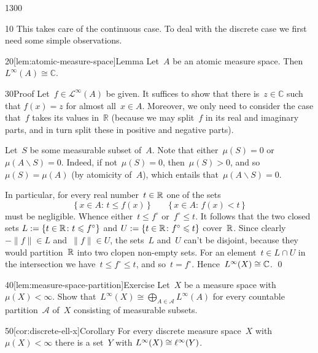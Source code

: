 \begin{parsec}{1300}%
\begin{point}{10}%
This takes care of the continuous case.
To deal with the discrete case we first need some
simple observations.
\end{point}
\begin{point}{20}[lem:atomic-measure-space]{Lemma}%
Let~$A$ be an atomic measure space.
Then~$L^\infty(A)\cong \mathbb{C}$.
\begin{point}{30}{Proof}
Let~$f\in \mathcal{L}^\infty(A)$ be given.
It suffices to show that
there is~$z\in \mathbb{C}$
such that
$f(x)=z$ for almost all~$x\in A$.
Moreover, we only need to consider the case
that~$f$ takes its values in~$\mathbb{R}$
(because we may split~$f$ in its real and imaginary parts,
and in turn split these in positive and negative parts).

Let~$S$ be some measurable subset of~$A$.
Note that either~$\mu(S)=0$ or~$\mu(A\backslash S)=0$.
Indeed, if not~$\mu(S)=0$,
then~$\mu(S)>0$,
and so~$\mu(S)=\mu(A)$
(by atomicity of~$A$),
which entails that~$\mu(A\backslash S)=0$.

In particular,
for every real number~$t\in\mathbb{R}$
one of the sets
\begin{equation*}
\{\,x\in A\colon\, t\leq f(x) \,\}
\qquad
\{\,x\in A\colon\, f(x)<t \,\}
\end{equation*}
must be negligible.  Whence
either~$t\leq f^\circ$ or~$f^\circ\leq t$.
It follows that
the two closed sets $L:=\{t\in\mathbb{R}\colon t\leqslant f^\circ\}$
and $U:=\{t\in \mathbb{R}\colon f^\circ\leqslant t\}$
cover~$\mathbb{R}$.
Since clearly~$-\|f\| \in L$
and~$\|f\|\in  U$,
the sets~$L$ and~$U$
can't be disjoint,
because they would partition~$\mathbb{R}$ into two clopen non-empty sets.
For an element~$t\in L\cap U$
in the intersection
we have~$ t\leq f^\circ \leq t$,
	and so~$t=f^\circ$. Hence~$L^\infty(X)\cong \mathbb{C}$. \qed
\end{point}
\end{point}
\begin{point}{40}[lem:measure-space-partition]{Exercise}%
Let~$X$ be a measure space with~$\mu(X)<\infty$.
Show that~$L^\infty(X)\cong \bigoplus_{A\in\mathcal{A}} L^\infty(A)$
for every countable partition~$\mathcal{A}$
of~$X$
consisting of measurable subsets.
\end{point}
\begin{point}{50}[cor:discrete-ell-x]{Corollary}%
For every discrete 
measure space~$X$ with~$\mu(X)<\infty$
there is a  set~$Y$ with $L^\infty(X)\cong \ell^\infty(Y)$.
\end{point}
\end{parsec}
